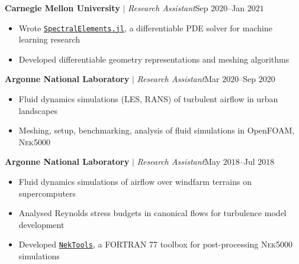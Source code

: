 \documentclass[10pt]{article}
\begin{document}
\begin{multicols}{2}
\vspace{0.5em}
%
\textbf{Carnegie Mellon University} $|$ \textit{Research Assistant}\hfill Sep $2020$--Jan $2021$

\vspace{-1.75em}
\begin{itemize}[label=-,leftmargin=1.0em]
    \setlength\itemsep{-0.25em}
    \item Wrote \href{https://github.com/vpuri3/SpectralElements.jl}{\texttt{SpectralElements.jl}}, a differentiable PDE solver for machine learning research
    \item Developed differentiable geometry representations and meshing algorithms
\end{itemize}
\vspace{-2.0em}

\vspace{0.5em}
%
\textbf{Argonne National Laboratory} $|$ \textit{Research Assistant}\hfill Mar $2020$--Sep $2020$

\vspace{-1.75em}
\begin{itemize}[label=-,leftmargin=1.0em]
    \setlength\itemsep{-0.25em}
    \item Fluid dynamics simulations (LES, RANS) of turbulent airflow in urban landscapes
    \item Meshing, setup, benchmarking, analysis of fluid simulations in OpenFOAM, \textsc{Nek5000}
\end{itemize}
\vspace{-2.0em}

\vspace{0.5em}
%
\textbf{Argonne National Laboratory} $|$ \textit{Research Assistant}\hfill May $2018$--Jul $2018$

\vspace{-1.75em}
\begin{itemize}[label=-,leftmargin=1.0em]
    \setlength\itemsep{-0.25em}
    \item Fluid dynamics simulations of airflow over windfarm terrains on supercomputers
    \item Analysed Reynolds stress budgets in canonical flows for turbulence model development
    \item Developed \href{https://github.com/vpuri3/NekTools}{\texttt{NekTools}}, a FORTRAN 77 toolbox for post-processing \textsc{Nek5000} simulations
\end{itemize}
\vspace{-2.0em}


\end{multicols}
\end{document}
